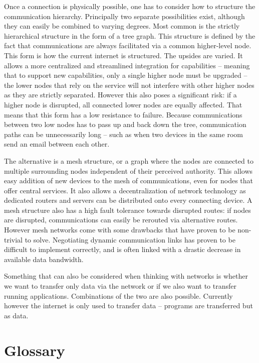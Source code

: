 \documentclass{acm_proc_article-sp}
\begin{document}
Once a connection is physically possible, one has to consider how to structure the communication hierarchy.
Principally two separate possibilities exist, although they can easily be combined to varying degrees.
Most common is the strictly hierarchical structure in the form of a tree graph.
This structure is defined by the fact that communications are always facilitated via a common higher-level node.
This form is how the current internet is structured.
The upsides are varied.
It allows a more centralized and streamlined integration for capabilities – meaning that to support new capabilities, only a single higher node must be upgraded – the lower nodes that rely on the service will not interfere with other higher nodes as they are strictly separated.
However this also poses a significant risk: if a higher node is disrupted, all connected lower nodes are equally affected.
That means that this form has a low resistance to failure.
Because communications between two low nodes has to pass up and back down the tree, communication paths can be unnecessarily long – such as when two devices in the same room send an email between each other.

The alternative is a mesh structure, or a graph where the nodes are connected to multiple surrounding nodes independent of their perceived authority.
This allows easy addition of new devices to the mesh of communications, even for nodes that offer central services.
It also allows a decentralization of network technology as dedicated routers and servers can be distributed onto every connecting device.
A mesh structure also has a high fault tolerance towards disrupted routes: if nodes are disrupted, communications can easily be rerouted via alternative routes.
However mesh networks come with some drawbacks that have proven to be non-trivial to solve.
Negotiating dynamic communication links has proven to be difficult to implement correctly, and is often linked with a drastic decrease in available data bandwidth.

Something that can also be considered when thinking with networks is whether we want to transfer only data via the network or if we also want to transfer running applications.
Combinations of the two are also possible.
Currently however the internet is only used to transfer data – programs are transferred but as data.

\section{Glossary}
\end{document}
